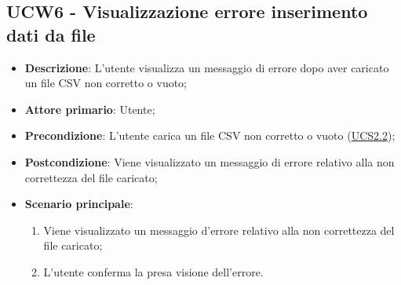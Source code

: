 \subsection{UCW6 - Visualizzazione errore inserimento dati da file}
\label{sub:ucw6}
\begin{itemize}
    \item \textbf{Descrizione}: L'utente visualizza un messaggio di errore dopo aver caricato un file CSV non corretto
          o vuoto;

    \item \textbf{Attore primario}: Utente;

    \item \textbf{Precondizione}:   L'utente carica un file CSV non corretto o vuoto (\hyperref[ssub:ucs2.2]{UCS2.2});

    \item \textbf{Postcondizione}:  Viene visualizzato un messaggio di errore relativo alla non correttezza del file
          caricato;

    \item \textbf{Scenario principale}:
          \begin{enumerate}
              \item Viene visualizzato un messaggio d'errore relativo alla non correttezza del file caricato;
              \item L'utente conferma la presa visione dell'errore.
          \end{enumerate}

\end{itemize}